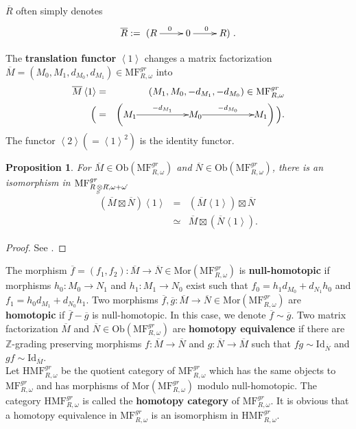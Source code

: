 \documentclass[10pt]{amsart}
\theoremstyle{break}
\newtheorem{pro}[de]{Proposition}
\begin{document}
$\overline{R}$ often simply denotes 
$$
\overline{R}:=\xymatrix{(R\ar[r]^0&0\ar[r]^0&R)}.
$$

\indent
The {\bf translation functor} $\left< 1 \right>$ changes a matrix factorization $\overline{M} = (M_{0},M_{1},d_{M_0},d_{M_1})\in {{\mathrm{MF}}}^{gr}_{R,\omega}$ into 
\begin{eqnarray*}
\overline{M} \left< 1 \right> &=&
(
M_{1},M_{0},-d_{M_1},-d_{M_0})\in {{\mathrm{MF}}}^{gr}_{R,\omega}\\
\Big(&=&\left(
\xymatrix{
*{M_{1}}\ar[rr]^{-d_{M_1}}&&*{M_{0}}\ar[rr]^{-d_{M_0}}&&*{M_{1}}
}
\right)\Big)
.
\end{eqnarray*}
The functor $\left< 2 \right> (= \left< 1 \right>^2)$ is the identity functor.
\begin{pro}
For $\overline{M} \in {{\mathrm{Ob}}}({{\mathrm{MF}}}^{gr}_{R,\omega})$ and $\overline{N} \in {{\mathrm{Ob}}}({{\mathrm{MF}}}^{gr}_{R\acute{},\omega\acute{}})$, 
there is an isomorphism in ${{\mathrm{MF}}}^{gr}_{R{{\,\otimes\hspace{-0.7em}\raisebox{-0.5ex}{${}_{{}_{S}}$}\,}} R\acute{},\omega + \omega \acute{}}$
\begin{eqnarray*}
(\overline{M}\boxtimes \overline{N})\left< 1 \right> &=& (\overline{M}\left< 1 \right> )\boxtimes \overline{N}\\[-0.1em]
&\simeq& \overline{M}\boxtimes (\overline{N}\left< 1 \right> ).
\end{eqnarray*}
\end{pro}
\begin{proof}
See \cite{Yone1}.
\end{proof}
\indent
The morphism $\overline{f}=(f_1,f_2): \overline{M} \to \overline{N} \in {{\mathrm{Mor}}} ({{\mathrm{MF}}}^{gr}_{R,\omega})$ is {\bf null-homotopic} 
if morphisms $h_{0}:M_0 \to N_1$ and $h_{1}:M_1 \to N_0$ exist 
such that $f_0 = h_1 d_{M_0} + d_{N_1} h_0$ and $f_1 = h_0 d_{M_1} + d_{N_0} h_1$.
Two morphisms $\overline{f},\overline{g}: \overline{M} \to \overline{N} \in {{\mathrm{Mor}}} ({{\mathrm{MF}}}^{gr}_{R,\omega})$ are {\bf homotopic} 
if $\overline{f} - \overline{g}$ is null-homotopic. In this case, we denote $\overline{f} \sim \overline{g}$. Two matrix factorization $\overline{M}$ and $\overline{N}\in{{\mathrm{Ob}}} ({{\mathrm{MF}}}^{gr}_{R,\omega})$ are {\bf homotopy equivalence} if there are ${{\mathbb{Z}}}$-grading preserving morphisms $f:\overline{M}\to \overline{N}$ and $g:\overline{N}\to \overline{M}$ such that $fg\sim {{\mathrm{Id}}}_{\overline{N}}$ and $gf\sim {{\mathrm{Id}}}_{\overline{M}}$.\\
\indent
Let ${{\mathrm{HMF}}}^{gr}_{R,\omega}$ be the quotient category of ${{\mathrm{MF}}}^{gr}_{R,\omega}$ which has the same objects to ${{\mathrm{MF}}}^{gr}_{R,\omega}$
and has morphisms of ${{\mathrm{Mor}}}({{\mathrm{MF}}}^{gr}_{R,\omega})$ modulo null-homotopic. The category ${{\mathrm{HMF}}}^{gr}_{R,\omega}$ is called the {\bf homotopy category} of ${{\mathrm{MF}}}^{gr}_{R,\omega}$. It is obvious that a homotopy equivalence in ${{\mathrm{MF}}}^{gr}_{R,\omega}$ is an isomorphism in ${{\mathrm{HMF}}}^{gr}_{R,\omega}$.
\end{document}

